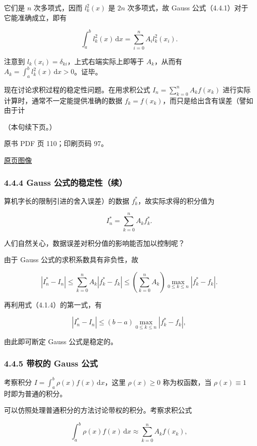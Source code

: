 它们是 \(n\) 次多项式，因而 \(l_k^2(x)\) 是 \(2n\) 次多项式，故 Gauss 公式（4.4.1）对于它能准确成立，即有

\[
\int_a^b l_k^2(x)\,\mathrm{d}x=\sum_{i=0}^{n}A_i l_k^2(x_i).
\]

注意到 \(l_k(x_i)=\delta_{ki}\)，上式右端实际上即等于 \(A_k\)，从而有 \(\displaystyle A_k=\int_a^b l_k^2(x)\,\mathrm{d}x>0\)。证毕。

现在讨论求积过程的稳定性问题。在用求积公式 \(\displaystyle I_n=\sum_{k=0}^{n}A_kf(x_k)\) 进行实际计算时，通常不一定能提供准确的数据 \(f_k=f(x_k)\)，而只是给出含有误差（譬如由于计

（本句续下页。）

\clearpage

原书 PDF 页 110；印刷页码 97。

\href{source-images/pdf-110.jpeg}{原页图像}

\subsubsection{4.4.4 Gauss 公式的稳定性（续）}\label{ch04b-gauss-ux516cux5f0fux7684ux7a33ux5b9aux6027ux7eed}

算机字长的限制引进的舍入误差）的数据 \(f_k^*\)，故实际求得的积分值为

\[
I_n^*=\sum_{k=0}^{n}A_kf_k^*.
\]

人们自然关心，数据误差对积分值的影响能否加以控制呢？

由于 Gauss 公式的求积系数具有非负性，故

\[
|I_n^*-I_n|\leq\sum_{k=0}^{n}A_k|f_k^*-f_k|
\leq\left(\sum_{k=0}^{n}A_k\right)\max_{0\leq k\leq n}|f_k^*-f_k|.
\]

再利用式（4.1.4）的第一式，有

\[
|I_n^*-I_n|\leq(b-a)\max_{0\leq k\leq n}|f_k^*-f_k|,
\]

由此即可断定 Gauss 公式是稳定的。

\subsubsection{4.4.5 带权的 Gauss 公式}\label{ch04b-ux5e26ux6743ux7684-gauss-ux516cux5f0f}

考察积分 \(\displaystyle I=\int_a^b\rho(x)f(x)\,\mathrm{d}x\)，这里 \(\rho(x)\geq0\) 称为权函数，当 \(\rho(x)\equiv1\) 时即为普通的积分。

可以仿照处理普通积分的方法讨论带权的积分。考察求积公式

\[
\int_a^b\rho(x)f(x)\,\mathrm{d}x\approx\sum_{k=0}^{n}A_kf(x_k),
\]

